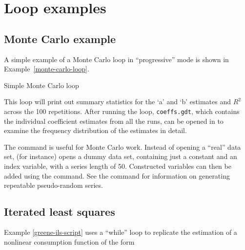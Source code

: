 \section{Loop examples}
\label{loop-examples}


\subsection{Monte Carlo example}
\label{loop-mc-example}

A simple example of a Monte Carlo loop in ``progressive'' mode is
shown in Example~\ref{monte-carlo-loop}.

\begin{script}[htbp]
  \caption{Simple Monte Carlo loop}
  \label{monte-carlo-loop}
\end{script}

This loop will print out summary statistics for the `a' and `b'
estimates and $R^2$ across the 100 repetitions.  After running the
loop, \verb+coeffs.gdt+, which contains the individual coefficient
estimates from all the runs, can be opened in  to examine
the frequency distribution of the estimates in detail.

The command  is useful for Monte Carlo work.  Instead of
opening a ``real'' data set,  (for instance) opens a
dummy data set, containing just a constant and an index variable, with
a series length of 50. Constructed variables can then be added using
the  command.  See the  command for information on
generating repeatable pseudo-random series.

\subsection{Iterated least squares}
\label{loop-ils-examples}

Example \ref{greene-ils-script} uses a ``while'' loop to replicate the
estimation of a nonlinear consumption function of the form
	

